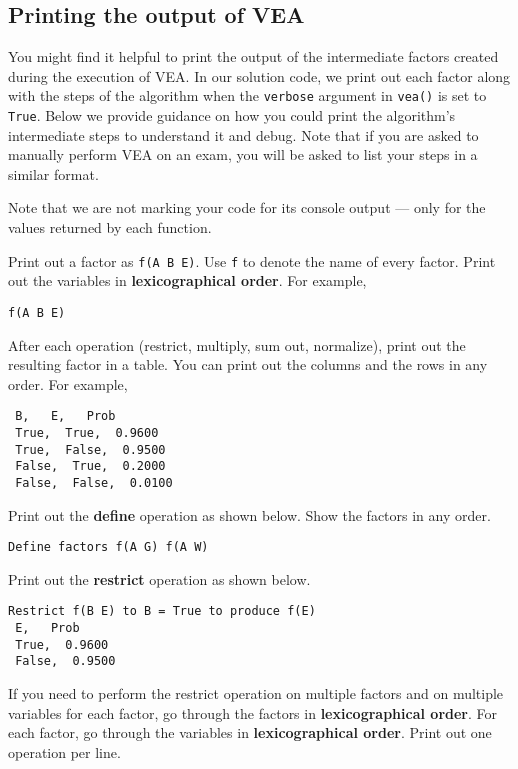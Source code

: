 \documentclass[12pt]{article}
\begin{document}
\begin{appendices}

\section{Printing the output of VEA}
\label{apx:vea_output_format}

You might find it helpful to print the output of the intermediate factors created during the execution of VEA. In our solution code, we print out each factor along with the steps of the algorithm when the \verb+verbose+ argument in \verb+vea()+ is set to \verb+True+. Below we provide guidance on how you could print the algorithm's intermediate steps to understand it and debug. Note that if you are asked to manually perform VEA on an exam, you will be asked to list your steps in a similar format.

Note that we are not marking your code for its console output --- only for the values returned by each function.

Print out a factor as \verb+f(A B E)+. Use \verb+f+ to denote the name of every factor. Print out the variables in {\bf lexicographical order}. For example,
%
\begin{verbatim}
f(A B E)
\end{verbatim}


After each operation (restrict, multiply, sum out, normalize), print out the resulting factor in a table. You can print out the columns and the rows in any order. For example,
%
\begin{verbatim}
 B,   E,   Prob
 True,  True,  0.9600
 True,  False,  0.9500
 False,  True,  0.2000
 False,  False,  0.0100
\end{verbatim}



Print out the {\bf define} operation as shown below. Show the factors in any order.
%
\begin{verbatim}
Define factors f(A G) f(A W)
\end{verbatim}


Print out the {\bf restrict} operation as shown below.  
\begin{verbatim}
Restrict f(B E) to B = True to produce f(E)
 E,   Prob
 True,  0.9600
 False,  0.9500
\end{verbatim}

If you need to perform the restrict operation on multiple factors and on multiple variables for each factor, go through the factors in {\bf lexicographical order}. For each factor, go through the variables in {\bf lexicographical order}. Print out one operation per line. 


\end{appendices}
\end{document}
